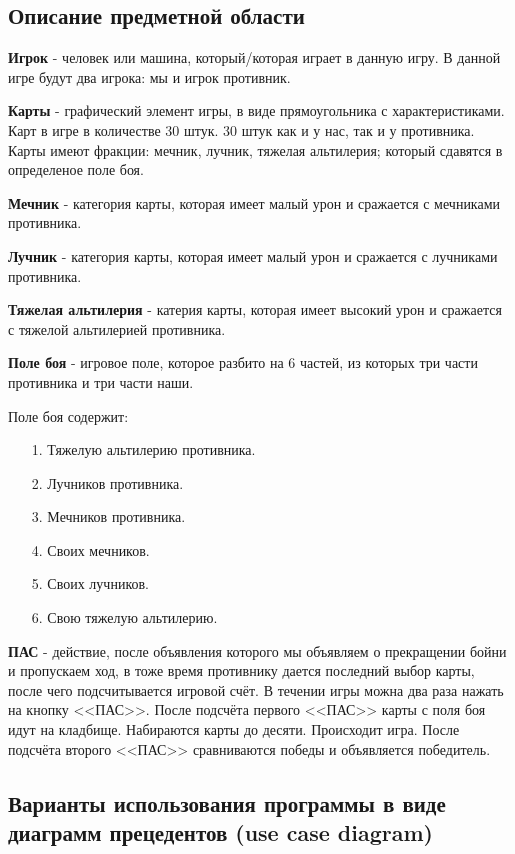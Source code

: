 \documentclass[12pt, a4paper, simple]{eskdtext}
\begin{document}
    \newpage
    \subsection{Описание предметной области}

    \textbf{Игрок} - человек или машина, который/которая играет в данную игру.
    В данной игре будут два игрока: мы и игрок противник.

    \textbf{Карты} - графический элемент игры, в виде прямоугольника с характеристиками.
    Карт в игре в количестве 30 штук. 30 штук как и у нас, так и у противника.
    Карты имеют фракции: мечник, лучник, тяжелая альтилерия; который сдавятся в определеное поле боя.
    
    \textbf{Мечник} - категория карты, которая имеет малый урон и сражается с мечниками противника.

    \textbf{Лучник} - категория карты, которая имеет малый урон и сражается с лучниками противника.

    \textbf{Тяжелая альтилерия} - катерия карты, которая имеет высокий урон и сражается с тяжелой альтилерией противника.

    \textbf{Поле боя} - игровое поле, которое разбито на 6 частей, из которых три части противника и три части наши.
    
    Поле боя содержит:

    \begin{enumerate}
        \item [1.] Тяжелую альтилерию противника.
        \item [2.] Лучников противника.
        \item [3.] Мечников противника.
        \item [4.] Своих мечников.
        \item [5.] Своих лучников.
        \item [6.] Свою тяжелую альтилерию.
    \end{enumerate}

    \textbf{ПАС} - действие, после объявления которого мы объявляем о прекращении бойни и пропускаем ход, в тоже время противнику дается последний выбор карты,
    после чего подсчитывается игровой счёт. В течении игры можна два раза нажать на кнопку <<ПАС>>.
    После подсчёта первого <<ПАС>> карты с поля боя идут на кладбище. Набираются карты до десяти.
    Происходит игра. После подсчёта второго <<ПАС>> сравниваются победы и объявляется победитель.

    \newpage
    \subsection{Варианты использования программы в виде диаграмм прецедентов (use case diagram)}
\end{document}
